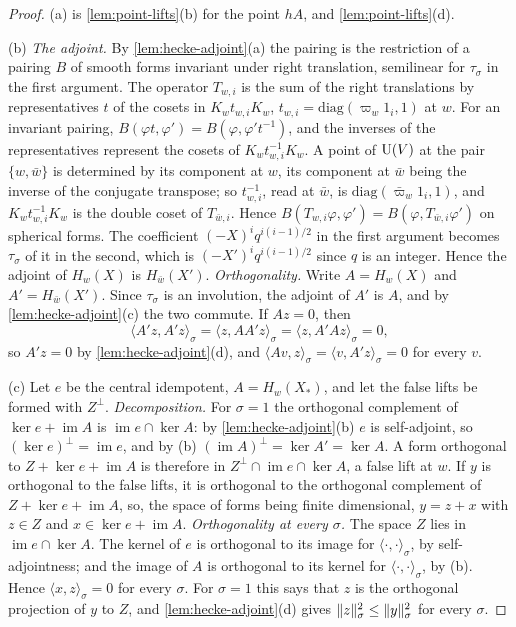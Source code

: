 \begin{proof}
(a) is \cref{lem:point-lifts}(b) for the point $hA$, and \cref{lem:point-lifts}(d).

(b) \emph{The adjoint.} By \cref{lem:hecke-adjoint}(a) the pairing is the restriction of a pairing $B$ of smooth forms invariant under right translation, semilinear for $\tau_\sigma$ in the first argument. The operator
$T_{w,i}$ is the sum of the right translations by representatives $t$ of the cosets in $K_wt_{w,i}K_w$, $t_{w,i}=\mathrm{diag}(\varpi_w1_i,1)$ at $w$. For an invariant pairing, $B(\varphi t,\varphi')=B(\varphi,\varphi't^{-1})$, and the inverses of
the representatives represent the cosets of $K_wt_{w,i}^{-1}K_w$. A point of $\operatorname{U}(V)$ at the pair $\{w,\bar w\}$ is determined by its component at $w$, its component at $\bar w$ being the inverse of the conjugate
transpose; so $t_{w,i}^{-1}$, read at $\bar w$, is $\mathrm{diag}(\bar\varpi_w1_i,1)$, and $K_wt_{w,i}^{-1}K_w$ is the double coset of $T_{\bar w,i}$. Hence $B(T_{w,i}\varphi,\varphi')=B(\varphi,T_{\bar w,i}\varphi')$ on spherical forms. The
coefficient $(-X)^iq^{i(i-1)/2}$ in the first argument becomes $\tau_\sigma$ of it in the second, which is $(-X')^iq^{i(i-1)/2}$ since $q$ is an integer. Hence the adjoint of $H_w(X)$ is $H_{\bar w}(X')$.
\emph{Orthogonality.} Write $A=H_w(X)$ and $A'=H_{\bar w}(X')$. Since $\tau_\sigma$ is an involution, the adjoint of $A'$ is $A$, and by \cref{lem:hecke-adjoint}(c) the two commute. If $Az=0$, then
\[
  \langle A'z,A'z\rangle_\sigma=\langle z,AA'z\rangle_\sigma=\langle z,A'Az\rangle_\sigma=0,
\]
so $A'z=0$ by \cref{lem:hecke-adjoint}(d), and $\langle Av,z\rangle_\sigma=\langle v,A'z\rangle_\sigma=0$ for every $v$.

(c) Let $e$ be the central idempotent, $A=H_w(X_*)$, and let the false lifts be formed with $Z^\perp$. \emph{Decomposition.} For $\sigma=1$ the orthogonal complement of $\ker e+\operatorname{im}A$ is $\operatorname{im}e\cap\ker A$: by
\cref{lem:hecke-adjoint}(b) $e$ is self-adjoint, so $(\ker e)^\perp=\operatorname{im}e$, and by (b) $(\operatorname{im}A)^\perp=\ker A'=\ker A$. A form orthogonal to $Z+\ker e+\operatorname{im}A$ is therefore in $Z^\perp\cap\operatorname{im}e\cap\ker A$, a false lift
at $w$. If $y$ is orthogonal to the false lifts, it is orthogonal to the orthogonal complement of $Z+\ker e+\operatorname{im}A$, so, the space of forms being finite dimensional, $y=z+x$ with $z\in Z$ and $x\in\ker e+\operatorname{im}A$.
\emph{Orthogonality at every $\sigma$.} The space $Z$ lies in $\operatorname{im}e\cap\ker A$. The kernel of $e$ is orthogonal to its image for $\langle\cdot,\cdot\rangle_\sigma$, by self-adjointness; and the image of $A$ is orthogonal to its kernel
for $\langle\cdot,\cdot\rangle_\sigma$, by (b). Hence $\langle x,z\rangle_\sigma=0$ for every $\sigma$. For $\sigma=1$ this says that $z$ is the orthogonal projection of $y$ to $Z$, and \cref{lem:hecke-adjoint}(d) gives $\lVert z\rVert_\sigma^2\le\lVert y\rVert_\sigma^2$
for every $\sigma$.
\end{proof}

